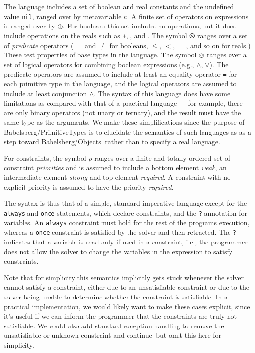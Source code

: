 \documentclass{article}
\begin{document}
The language includes a set of boolean and real constants and the
undefined value {\tt nil}, ranged over by metavariable {\tt c}. A
finite set of operators on expressions is ranged over by $\oplus$. For
booleans this set includes no operations, but it does include
operations on the reals such as {\tt +}, {\tt *}, and {\tt   \textsurd}. 
The symbol $\olessthan$ ranges over a set of {\em predicate} operators
({\tt $=$} and {\tt $\neq$} for booleans, $\leq$, $<$, $=$, and so on
for reals.)  These test properties of base types in the language. The
symbol $\ovee$ ranges over a set of logical operators for combining
boolean expressions (e.g., {\tt $\wedge$}, {\tt $\vee$}).  The
predicate operators are assumed to include at least an equality
operator {\tt =} for each primitive type in the language, and the
logical operators are assumed to include at least conjunction {\tt $\wedge$}.
The syntax of this language does have some limitations as compared
with that of a practical language --- for example, there are only
binary operators (not unary or ternary), and the result must have the
same type as the arguments.  We make these simplifications since the
purpose of Babelsberg/PrimitiveTypes is to elucidate the semantics of
such languages as as a step toward Babelsberg/Objects, rather than to
specify a real language.

For constraints, the symbol $\rho$ ranges over a finite and totally
ordered set of constraint {\em priorities} and is assumed to include a
bottom element {\em weak}, an intermediate element {\em strong} and
top element {\em required}.  A constraint with no explicit priority is
assumed to have the priority {\em required}.

The syntax is thus that of a simple, 
standard imperative language except for the
{\tt always} and {\tt once} statements, which declare constraints, and
the {\tt ?} annotation for variables. An {\tt always} constraint must
hold for the rest of the programs execution, whereas a {\tt once}
constraint is satisfied by the solver and then retracted. The {\tt ?}
indicates that a variable is read-only if used in a constraint,
i.e.\@, the programmer does not allow the solver to change the
variables in the expression to satisfy constraints.

Note that for simplicity this semantics implicitly gets stuck whenever
the solver cannot satisfy a constraint, either due to an unsatisfiable
constraint or due to the solver being unable to determine whether the
constraint is satisfiable. In a practical implementation, we would
likely want to make these cases explicit, since it's useful if we can
inform the programmer that the constraints are truly not satisfiable.
We could also add standard exception handling to remove the
unsatisfiable or unknown constraint and continue, but omit this here
for simplicity.
\end{document}

